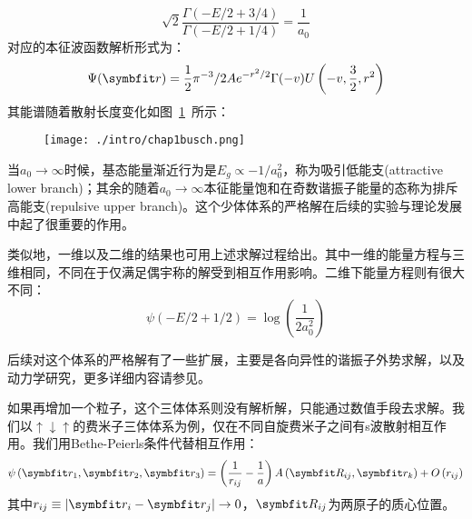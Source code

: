 \begin{equation}
\sqrt{2} \frac{\Gamma(-E / 2+3 / 4)}{\Gamma(-E / 2+1 / 4)}=\frac{1}{a_{0}}
\end{equation}
对应的本征波函数解析形式为：
\begin{equation}
\Psi(\Vector{r})=\frac{1}{2} \pi^{-3} / 2 A e^{-r^{2} / 2} \Gamma(-v) U\left(-v, \frac{3}{2}, r^{2}\right)
\end{equation}
其能谱随着散射长度变化如图~\ref{chap1busch}~所示：
\begin{figure}[!htbp]
    \centering
    \texttt{[image: ./intro/chap1busch.png]}
    \label{chap1busch}
\end{figure}
当$a_0\to \infty$时候，基态能量渐近行为是$E_g\propto - 1/a_0^2$，称为吸引低能支(attractive lower branch)；其余的随着$a_0\to\infty$本征能量饱和在奇数谐振子能量的态称为排斥高能支(repulsive upper branch)。这个少体体系的严格解在后续的实验与理论发展中起了很重要的作用。

类似地，一维以及二维的结果也可用上述求解过程给出。其中一维的能量方程与三维相同，不同在于仅满足偶宇称的解受到相互作用影响。二维下能量方程则有很大不同：
\begin{equation}
\psi(-E / 2+1 / 2)=\log \left(\frac{1}{2 a_{0}^{2}}\right)
\end{equation}

后续对这个体系的严格解有了一些扩展，主要是各向异性的谐振子外势求解，以及动力学研究，更多详细内容请参见\cite{blume2012few}。

如果再增加一个粒子，这个三体体系则没有解析解，只能通过数值手段去求解。我们以$\uparrow\downarrow\uparrow$的费米子三体体系为例，仅在不同自旋费米子之间有s波散射相互作用\cite{OlshaniiRigorous2001,Petrov2003unitary3b,Fleix2006prlunitary3b,Felix2006praunitary3b,LmDuan2007levelcrossing,Stetcu2007,Blume2008,Blume2010,Xiaji2009prl,Xiaji20103b,Rittenhouse2010green}。我们用Bethe-Peierls条件代替相互作用：
\begin{equation}
\psi\left(\Vector{r}_{1}, \Vector{r}_{2}, \Vector{r}_{3}\right)=\left(\frac{1}{r_{i j}}-\frac{1}{a}\right) A\left(\Vector{R}_{i j}, \Vector{r}_{k}\right)+O\left(r_{i j}\right)
\end{equation}
其中$r_{i j} \equiv\left|\Vector{r}_{i}-\Vector{r}_{j}\right| \rightarrow 0$，$\Vector{R}_{ij}$为两原子的质心位置。

